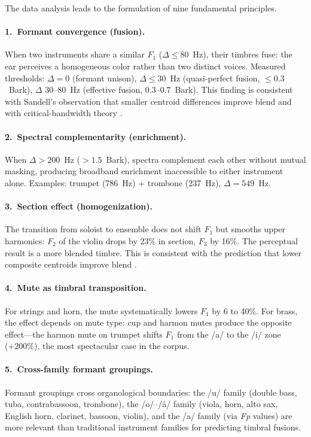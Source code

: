 \documentclass[12pt,a4paper]{article}
\begin{document}
The data analysis leads to the formulation of nine fundamental principles.

\paragraph{1.\ Formant convergence (fusion).}
When two instruments share a similar $F_1$ ($\Delta \leq 80$~Hz), their
timbres fuse: the ear perceives a homogeneous color rather than two distinct
voices. Measured thresholds: $\Delta = 0$ (formant unison), $\Delta \leq 30$~Hz
(quasi-perfect fusion, $\leq 0.3$~Bark), $\Delta$ 30--80~Hz (effective fusion,
0.3--0.7~Bark). This finding is consistent with Sandell's observation that
smaller centroid differences improve blend \citep{Sandell1995} and with
critical-bandwidth theory \citep{Zwicker1961}.

\paragraph{2.\ Spectral complementarity (enrichment).}
When $\Delta > 200$~Hz ($> 1.5$~Bark), spectra complement each other without
mutual masking, producing broadband enrichment inaccessible to either instrument
alone. Examples: trumpet (786~Hz) + trombone (237~Hz), $\Delta = 549$~Hz.

\paragraph{3.\ Section effect (homogenization).}
The transition from soloist to ensemble does not shift $F_1$ but smooths upper
harmonics: $F_2$ of the violin drops by 23\% in section, $F_3$ by 16\%. The
perceptual result is a more blended timbre. This is consistent with the
prediction that lower composite centroids improve blend \citep{Sandell1995}.

\paragraph{4.\ Mute as timbral transposition.}
For strings and horn, the mute systematically lowers $F_1$ by 6 to 40\%. For
brass, the effect depends on mute type: cup and harmon mutes produce the
opposite effect---the harmon mute on trumpet shifts $F_1$ from the /a/ to the
/i/ zone (+200\%), the most spectacular case in the corpus.

\paragraph{5.\ Cross-family formant groupings.}
Formant groupings cross organological boundaries: the /u/ family (double bass,
tuba, contrabassoon, trombone), the /o/--/\aa/ family (viola, horn, alto sax,
English horn, clarinet, bassoon, violin), and the /a/ family (via \textit{Fp}
values) are more relevant than traditional instrument families for predicting
timbral fusions.
\end{document}
